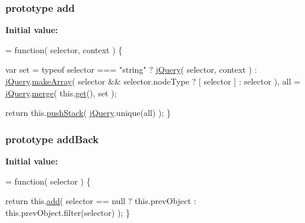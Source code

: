 \subsubsection[{add}]{ {\bf prototype} add}\label{jquery-1_810_82-vsdoc_8js_a2f34e089948aad779d5a43c9b381caa6}
{\bfseries Initial value\+:}
\begin{DoxyCode}
= \textcolor{keyword}{function}( selector, context ) \{


        var set = typeof selector === \textcolor{stringliteral}{"string"} ?
                \hyperlink{jquery-1_810_82-vsdoc_8js_add5237586d970a38a81f990e8eb28c6c}{jQuery}( selector, context ) :
                \hyperlink{jquery-1_810_82-vsdoc_8js_add5237586d970a38a81f990e8eb28c6c}{jQuery}.\hyperlink{jquery-1_810_82-vsdoc_8js_aeb415829cbd66d6538dadc5de9adc5ab}{makeArray}( selector && selector.nodeType ? [ selector ] : selector ),
            all = \hyperlink{jquery-1_810_82-vsdoc_8js_add5237586d970a38a81f990e8eb28c6c}{jQuery}.\hyperlink{jquery-1_810_82-vsdoc_8js_a32b25eeaa50c1bd6453e8956949b36e3}{merge}( this.\hyperlink{jquery-1_810_82-vsdoc_8js_a904e08d31e9d836b29247ea5e274ae83}{get}(), set );

        \textcolor{keywordflow}{return} this.\hyperlink{jquery-1_810_82-vsdoc_8js_afc3a7db1ef2b526338c06c07cecccd44}{pushStack}( \hyperlink{jquery-1_810_82-vsdoc_8js_add5237586d970a38a81f990e8eb28c6c}{jQuery}.unique(all) );
    \}
\end{DoxyCode}
\hypertarget{jquery-1_810_82-vsdoc_8js_a02deded61c52384361b4c1f47f86bb03}{}
\subsubsection[{add\+Back}]{ {\bf prototype} add\+Back}\label{jquery-1_810_82-vsdoc_8js_a02deded61c52384361b4c1f47f86bb03}
{\bfseries Initial value\+:}
\begin{DoxyCode}
= \textcolor{keyword}{function}( selector ) \{

        \textcolor{keywordflow}{return} this.\hyperlink{jquery-1_810_82-vsdoc_8js_a2f34e089948aad779d5a43c9b381caa6}{add}( selector == null ?
            this.prevObject : this.prevObject.filter(selector)
        );
    \}
\end{DoxyCode}
\hypertarget{jquery-1_810_82-vsdoc_8js_ac98f6924e42def59f1eb8d3ea1892a8e}{}
